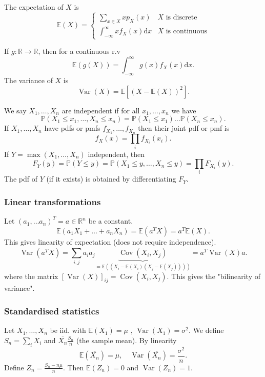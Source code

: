 \documentclass[egregdoesnotlikesansseriftitles,a4paper]{scrartcl}
\begin{document}
\begin{definition*}
     The expectation of $X$ is 
     \begin{equation*}
          \mathbb{E} (X)=
          \begin{cases}
              \sum_{x \in X}^{}x p_X (x) & X \text{ is discrete} \\
              \int_{-\infty }^{\infty} x f_X (x)\mathrm{d}x & X \text{ is continuous}
          \end{cases}
     \end{equation*}
     
     If $g: \mathbb{R} \to \mathbb{R} $, then for a continuous r.v \[
     \mathbb{E} (g (X))=\int_{-\infty }^{\infty} g (x) f_X (x)\mathrm{d}x
     .\] 
     The variance of $X$ is \[
          \operatorname{Var} (X)= \mathbb{E} [(X-\mathbb{E}(X))^2]
     .\] 
\end{definition*}
\begin{definition*}[Independence]
     We say $X_1 , \ldots ,X_n$ are independent if for all $x_1 , \ldots , x_n$ we have \[
     \mathbb{P} (X_1 \leq x_1 , \ldots ,X_n \leq x_n )=\mathbb{P}(X_1 \leq x_1) \ldots \mathbb{P}(X_n \leq x_n)
     .\] 
     If $X_1 , \ldots ,X_n $ have pdfs or pmfs $f_{X_1 }, \ldots,f_{X_n } $ then their joint pdf or pmf is \[
     f_X (x)=\prod_{i}f_{X_i}(x_i)
     .\] 
     If $Y=\max (X_1 , \ldots ,X_n)$ independent, then \[
     F_Y (y)=\mathbb{P} (Y \leq y)=\mathbb{P} (X_1 \leq y , \ldots ,X_n \leq y )=\prod_{i}F_{X_i}(y)
     .\] The pdf of $Y$ (if it exists) is obtained by differentiating $F_Y$.
\end{definition*}
\subsubsection*{Linear transformations}
Let $(a_1 , \ldots a_n)^T=a \in \mathbb{R}^{n}$ be a constant. \[
\mathbb{E} (a_1 X_1 +\ldots +a_n X_n)=\mathbb{E}(a^{T}X)=a^{T}\mathbb{E}(X)
.\]
This gives linearity of expectation (does not require independence). 
\[
\operatorname{Var}(a^{T}X)=\sum_{i,j}^{}a_{i}a_{j}\underbrace{\operatorname{Cov}(X_{i}, X_{j})}_{=\mathbb{E}((X_{i}-\mathbb{E}(X_{i})(X_{j}-\mathbb{E}(X_{j}))))} =a^{T}\operatorname{Var}(X)a
.\] 
where the matrix $[\operatorname{Var}(X)]_{ij}=\operatorname{Cov}(X_{i},X_{j})$. This gives the "bilinearity of variance".
\subsubsection*{Standardised statistics}
Let $X_1 , \ldots , X_n$ be iid. with $\mathbb{E}(X_1 )=\mu$ , $\operatorname{Var}(X_1)=\sigma^2$. We define $S_n=\sum_{i}^{}X_{i}$ and $\overline{X_n} \frac{S_n}{n} $ (the sample mean). By linearity \[
\mathbb{E} (\overline{X_n} )=\mu, \quad \operatorname{Var }(\overline{X_n} )= \frac{\sigma^2}{n}
.\]   
Define $Z_{n}= \frac{S_{n}-n \mu}{n}$. Then $\mathbb{E}(Z_{n})=0$ and $\operatorname{Var}(Z_{n})=1$. 
\end{document}
